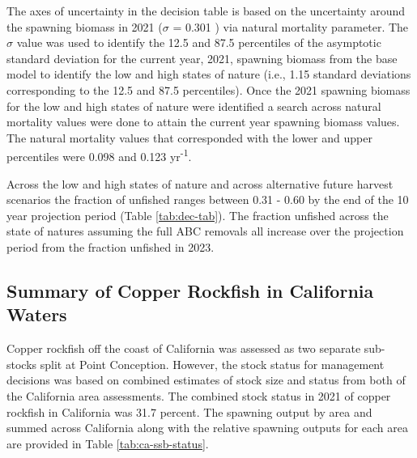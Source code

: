 \documentclass[11pt,
  english,
  a4paper,
]{article}
\begin{document}
\leavevmode\tagmcend\tagstructend\par


The axes of uncertainty in the decision table is based on the uncertainty around the spawning biomass in 2021 ({\(\sigma\)\leavevmode\tagmcend\tagstructend} = 0.301 ) via natural mortality parameter. The {\(\sigma\)\leavevmode\tagmcend\tagstructend} value was used to identify the 12.5 and 87.5 percentiles of the asymptotic standard deviation for the current year, 2021, spawning biomass from the base model to identify the low and high states of nature (i.e., 1.15 standard deviations corresponding to the 12.5 and 87.5 percentiles). Once the 2021 spawning biomass for the low and high states of nature were identified a search across natural mortality values were done to attain the current year spawning biomass values. The natural mortality values that corresponded with the lower and upper percentiles were 0.098 and 0.123 yr\textsuperscript{-1}.

\leavevmode\tagmcend\tagstructend\par


Across the low and high states of nature and across alternative future harvest scenarios the fraction of unfished ranges between 0.31 - 0.60 by the end of the 10 year projection period (Table \ref{tab:dec-tab}). The fraction unfished across the state of natures assuming the full ABC removals all increase over the projection period from the fraction unfished in 2023.

\leavevmode\tagmcend\tagstructend\par


\hypertarget{summary-of-copper-rockfish-in-california-waters}{%
\subsection{Summary of Copper Rockfish in California Waters}\label{summary-of-copper-rockfish-in-california-waters}}

\leavevmode\tagmcend\tagstructend


Copper rockfish off the coast of California was assessed as two separate sub-stocks split at Point Conception. However, the stock status for management decisions was based on combined estimates of stock size and status from both of the California area assessments. The combined stock status in 2021 of copper rockfish in California was 31.7 percent. The spawning output by area and summed across California along with the relative spawning outputs for each area are provided in Table \ref{tab:ca-ssb-status}.
\end{document}
